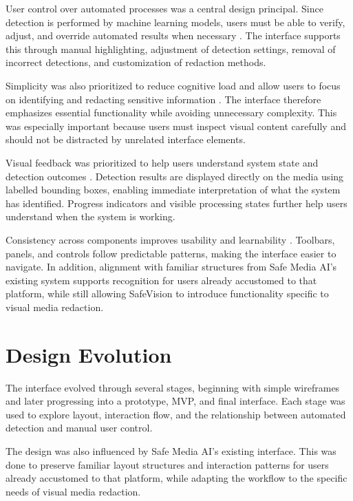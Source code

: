 
User control over automated processes was a central design principal. Since detection is performed by machine learning models, users must be able to verify, adjust, and override automated results when necessary \cite{hartson2012ux}. The interface supports this through manual highlighting, adjustment of detection settings, removal of incorrect detections, and customization of redaction methods.

Simplicity was also prioritized to reduce cognitive load and allow users to focus on identifying and redacting sensitive information \cite{norman2013design}. The interface therefore emphasizes essential functionality while avoiding unnecessary complexity. This was especially important because users must inspect visual content carefully and should not be distracted by unrelated interface elements.

Visual feedback was prioritized to help users understand system state and detection outcomes \cite{norman2013design}. Detection results are displayed directly on the media using labelled bounding boxes, enabling immediate interpretation of what the system has identified. Progress indicators and visible processing states further help users understand when the system is working.

Consistency across components improves usability and learnability \cite{nielsen2020progressive}. Toolbars, panels, and controls follow predictable patterns, making the interface easier to navigate. In addition, alignment with familiar structures from Safe Media AI's existing system supports recognition for users already accustomed to that platform, while still allowing SafeVision to introduce functionality specific to visual media redaction.

\section{Design Evolution}

The interface evolved through several stages, beginning with simple wireframes and later progressing into a prototype, MVP, and final interface. Each stage was used to explore layout, interaction flow, and the relationship between automated detection and manual user control.

The design was also influenced by Safe Media AI's existing interface. This was done to preserve familiar layout structures and interaction patterns for users already accustomed to that platform, while adapting the workflow to the specific needs of visual media redaction.

